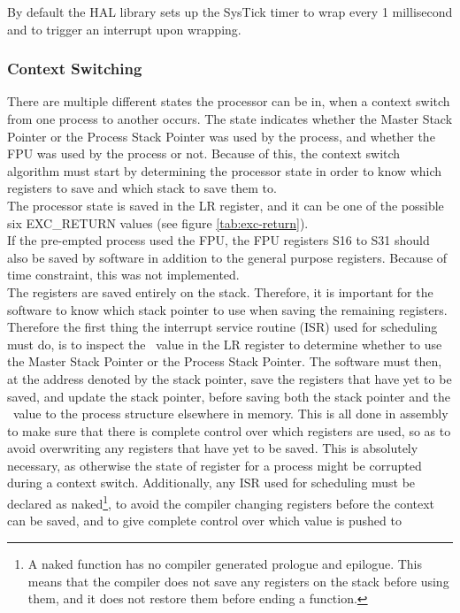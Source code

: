 By default the HAL library sets up the SysTick timer to wrap every 1 millisecond
and to trigger an interrupt upon wrapping.

\subsubsection{Context Switching}
There are multiple different states the processor can be in, when a context
switch from one process to another occurs. The state indicates whether the
Master Stack Pointer or the Process Stack Pointer was used by the process,
and whether the FPU was used by the process or not. Because of this, the context
switch algorithm must start by determining the processor state in order to know
which registers
to save and which stack to save them to.\\
The processor state is saved in the LR register, and it can be one of
the possible six EXC\_RETURN values (see figure \ref{tab:exc-return}).\\
If the pre-empted process used the FPU, the FPU registers S16 to S31
should also be saved by software in addition to the general purpose registers.
Because of time constraint, this was not implemented.\\
The registers are saved entirely on the stack. Therefore, it is important for
the software to know which
stack pointer to use when saving the remaining registers. Therefore the first
thing the interrupt service routine (ISR) used for scheduling must do, is to inspect
the \excreturn\ value in the LR register to determine whether to use the
Master Stack Pointer or the Process Stack Pointer. The software must then, at
the address denoted by the stack pointer, save the registers that have yet to be
saved, and update the stack pointer, before saving both the stack pointer and
the \excreturn\ value to the process structure elsewhere in memory. This is all
done in assembly to make sure that there is complete control over which
registers are used, so as to avoid overwriting any registers that have yet to be
saved. This is absolutely necessary, as otherwise the state of register for a
process might be corrupted during a context switch. Additionally, any ISR used
for scheduling must be declared as naked\footnote{A naked function has no
compiler generated prologue and epilogue. This means that the compiler does not
save any registers on the stack before using them, and it does not restore them
before ending a function.}, to avoid the compiler changing registers before the
context can be saved, and to give complete control over which value is pushed to
